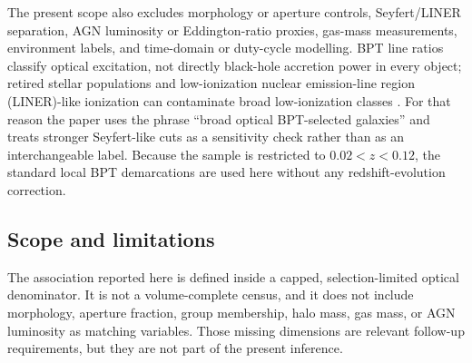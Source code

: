 \documentclass[twocolumn]{aastex631}
\begin{document}
The present scope also excludes morphology or aperture controls, Seyfert/LINER separation, AGN luminosity or Eddington-ratio proxies, gas-mass measurements, environment labels, and time-domain or duty-cycle modelling. BPT line ratios classify optical excitation, not directly black-hole accretion power in every object; retired stellar populations and low-ionization nuclear emission-line region (LINER)-like ionization can contaminate broad low-ionization classes \citep{stasinska2008,stasinska2015}. For that reason the paper uses the phrase ``broad optical BPT-selected galaxies'' and treats stronger Seyfert-like cuts as a sensitivity check rather than as an interchangeable label. Because the sample is restricted to $0.02<z<0.12$, the standard local BPT demarcations are used here without any redshift-evolution correction.

\subsection{Scope and limitations}
The association reported here is defined inside a capped, selection-limited optical denominator. It is not a volume-complete census, and it does not include morphology, aperture fraction, group membership, halo mass, gas mass, or AGN luminosity as matching variables. Those missing dimensions are relevant follow-up requirements, but they are not part of the present inference.
\end{document}
